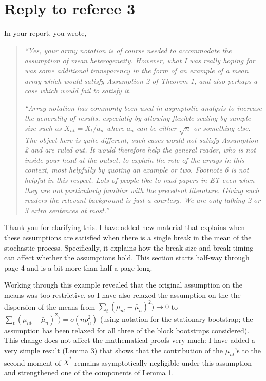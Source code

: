 \documentclass[12pt]{article}
\begin{document}
\section*{\hfill Reply to referee 3\hfill}

In your report, you wrote,
\begin{quotation}
  \noindent\textit{``Yes, your array notation is of course needed to
    accommodate the assumption of mean heterogeneity. However, what I
    was really hoping for was some additional transparency in the form
    of an example of a mean array which would satisfy Assumption 2 of
    Theorem 1, and also perhaps a case which would fail to satisfy
    it.}

  \textit{``Array notation has commonly been used in asymptotic
    analysis to increase the generality of results, especially by
    allowing flexible scaling by sample size such as
    $X_{nt} = X_t/a_n$ where $a_n$ can be either $\sqrt{n}$ or
    something else. The object here is quite different, such cases
    would not satisfy Assumption 2 and are ruled out. It would
    therefore help the general reader, who is not inside your head at
    the outset, to explain the role of the arrays in this context,
    most helpfully by quoting an example or two. Footnote 6 is not
    helpful in this respect. Lots of people like to read papers in ET
    even when they are not particularly familiar with the precedent
    literature. Giving such readers the relevant background is just a
    courtesy. We are only talking 2 or 3 extra sentences at most.''}
\end{quotation}

Thank you for clarifying this. I have added new material that explains
when these assumptions are satisfied when there is a single break in
the mean of the stochastic process. Specifically, it explains how the
break size and break timing can affect whether the assumptions
hold. This section starts half-way through page 4 and is a bit more
than half a page long.

Working through this example revealed that the original assumption
on the means was too restrictive, so I have also relaxed the
assumption on the the dispersion of the means from
$\sum_t (\mu_{nt} - \bar \mu_n)^2) \to 0$ to
$\sum_t (\mu_{nt} - \bar \mu_n)^2) = o(n p_n^2)$ (using notation for
the stationary bootstrap; the assumption has been relaxed for all
three of the block bootstraps considered).  This change does not
affect the mathematical proofs very much: I have added a very simple
result (Lemma 3) that shows that the contribution of the $\mu_{nt}$'s to the
second moment of $\bar X^*$ remains asymptotically negligible under
this assumption and strengthened one of the components of Lemma 1.
\end{document}
